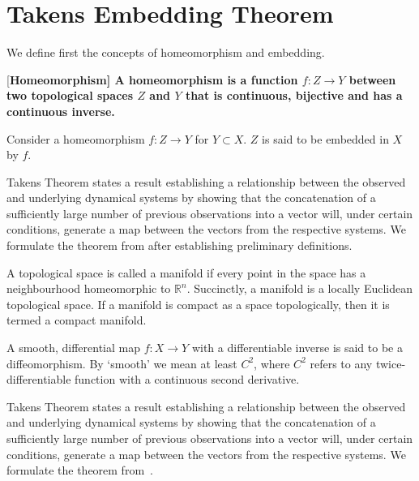 \section{Takens Embedding Theorem}\label{sect_Takens}

We define first the concepts of homeomorphism and embedding.
\begin{Definition} \rm
  [\bf {Homeomorphism}]\label{Dfn_homeo}\rm
  A homeomorphism is a function $f:Z\rightarrow Y$ between two topological spaces $Z$ and $Y$ that is continuous, bijective and has a continuous inverse. 
\end{Definition}

\begin{Definition}
  [\bf{Embedding}]\label{Dfn_embed}\rm
  Consider a homeomorphism $f:Z\rightarrow Y$ for $Y\subset X$. $Z$ is said to be embedded in $X$ by $f$.
\end{Definition}

Takens Theorem states a result establishing a relationship between the observed and underlying dynamical systems by showing that the concatenation of a sufficiently large number of previous observations into a vector will, under certain conditions, generate a map between the vectors from the respective systems.  We formulate the theorem from \cite{takens1981detecting} after establishing preliminary definitions.  

\begin{Definition}
  \label{Dfn_compactManif}\rm
  A topological space is called a manifold if every point in the space has a neighbourhood homeomorphic to $\mathbb{R}^n$. Succinctly, a manifold is a locally Euclidean topological space.
  If a manifold is compact as a space topologically, then it is termed a compact manifold.
\end{Definition}

\begin{Definition}
  [\bf{Diffeomorphism}]\label{Dfn_diffeo}\rm
  A smooth, differential map $f:X\to{Y}$ with a differentiable inverse is said to be a diffeomorphism. By `smooth' we mean at least $C^2$, where $C^2$ refers to any twice-differentiable function  with a continuous second derivative.
\end{Definition}

Takens Theorem states a result establishing a relationship between the observed and underlying dynamical systems by showing that the concatenation of a sufficiently large number of previous observations into a vector will, under certain conditions, generate a map between the vectors from the respective systems.  We formulate the theorem from~\cite{takens1981detecting}.  

